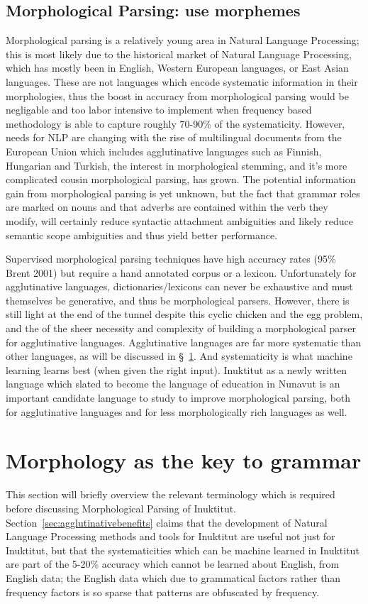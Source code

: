 \documentclass[runningheads,a4paper]{llncs}
\begin{document}
\subsection{Morphological Parsing: use morphemes}
\label{parsing}
Morphological parsing is a relatively young area in Natural Language Processing; this is most likely due to the historical market of Natural Language Processing, which has mostly been in English, Western European languages, or East Asian languages. These are not languages which encode systematic information in their morphologies, thus the boost in accuracy from morphological parsing would be negligable and too labor intensive to implement when frequency based methodology is able to capture roughly 70-90\% of the systematicity. However, needs for NLP are changing with the rise of multilingual documents from the European Union which includes agglutinative languages such as Finnish, Hungarian and Turkish, the interest in morphological stemming, and it's more complicated cousin morphological parsing, has grown. The potential information gain from morphological parsing is yet unknown, but the fact that grammar roles are marked on nouns and that adverbs are contained within the verb they modify, will certainly reduce syntactic attachment ambiguities and likely reduce semantic scope ambiguities and thus yield better performance. 

Supervised morphological parsing techniques have high accuracy rates (95\% Brent 2001) but require a hand annotated corpus or a lexicon. Unfortunately for agglutinative languages, dictionaries/lexicons  can never be exhaustive and must themselves be generative, and thus be morphological parsers. However, there is still light at the end of the tunnel despite this cyclic chicken and the egg problem, and the of the sheer necessity and complexity of building a morphological parser for agglutinative languages. Agglutinative languages are far more systematic than other languages, as will be discussed in \S~\ref{morphology}. And systematicity is what machine learning learns best (when given the right input). Inuktitut as a newly written language which slated to become the language of education in Nunavut is an important candidate language to study to improve morphological parsing, both for agglutinative languages and for less morphologically rich languages as well.

\section{Morphology as the key to grammar}
\label{morphology}
This section will briefly overview the relevant terminology which is required before discussing Morphological Parsing of Inuktitut. Section~\ref{sec:agglutinativebenefits} claims that the development of Natural Language Processing methods and tools for Inuktitut are useful not just for Inuktitut, but that the systematicities which can be machine learned in Inuktitut are part of the 5-20\% accuracy which cannot be learned about English, from English data; the English data which due to grammatical factors rather than frequency factors is so sparse that patterns are obfuscated by frequency. 
\end{document}
